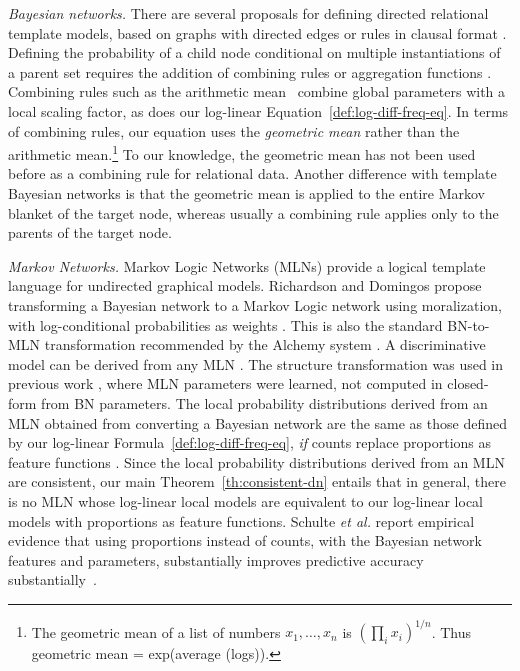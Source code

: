 \documentclass[runningheads,a4paper]{llncs}
\newcommand{\etal}{\textit{et al.}}
\begin{document}
\emph{Bayesian networks.} There are several proposals for defining directed relational template models, based on graphs with directed edges or rules in clausal format \cite{Kersting2007,Getoor2007c}. Defining the probability of a child node conditional on multiple instantiations of a parent set requires the addition of combining rules \cite{Kersting2007} or aggregation functions \cite{Getoor2007c}. 
Combining rules such as the arithmetic mean~\cite{Natarajan2008} combine global parameters with a local scaling factor, as does our log-linear Equation~\eqref{def:log-diff-freq-eq}. In terms of combining rules,  our equation uses the {\em geometric mean} rather than the arithmetic mean.\footnote{The geometric mean of a list of numbers $x_{1},\ldots,x_{n}$ is $(\prod_{i} x_{i})^{1/n}$. %
Thus geometric mean = exp(average (logs)).} To our knowledge, the geometric mean has not been used before as a combining rule for relational data.  
Another difference with template Bayesian networks is that the geometric mean is applied to the entire Markov blanket of the target node, whereas usually a combining rule applies only to the parents of the target node. 

\emph{Markov Networks.} Markov Logic Networks (MLNs) provide a logical template language for undirected graphical models. 
Richardson and Domingos propose transforming a Bayesian network to a Markov Logic network using moralization, with log-conditional probabilities as weights \cite{Domingos2009}. 
This is also the standard BN-to-MLN transformation recommended by the Alchemy system \cite{bib:bayes-convert}. A discriminative model can be derived from any MLN \cite{Domingos2009}.  The structure transformation was used in previous work \cite{Schulte2012}, where MLN parameters were learned, not computed in closed-form from BN parameters. The local probability distributions derived from an MLN obtained from converting a Bayesian network are the same as those defined by our log-linear Formula~\ref{def:log-diff-freq-eq}, {\em if} counts replace proportions as feature functions \cite{Schulte2011}. Since the local probability distributions derived from an MLN are consistent, our main Theorem~\ref{th:consistent-dn} entails that in general, there is no MLN whose log-linear local models are equivalent to our log-linear local models with  proportions as feature functions.  Schulte \etal{} report empirical evidence that using proportions instead of counts, with the Bayesian network features and parameters, substantially improves predictive accuracy substantially~\cite{Schulte2012d}.
 
\end{document}
